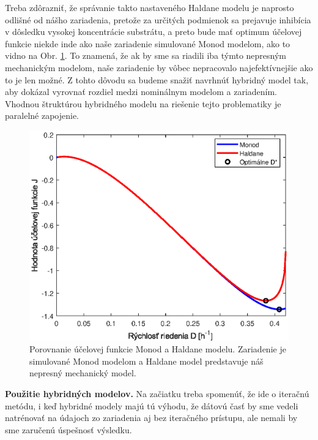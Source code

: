 Treba zdôrazniť, že správanie takto nastaveného Haldane modelu je naprosto odlišné od nášho zariadenia, pretože za určitých podmienok sa prejavuje inhibícia v dôsledku vysokej koncentrácie substrátu, a preto bude mať optimum účelovej funkcie niekde inde ako naše zariadenie simulované Monod modelom, ako to vidno na Obr. \ref{fig:cost_fun_comparison}. To znamená, že ak by sme sa riadili iba týmto nepresným mechanickým modelom, naše zariadenie by vôbec nepracovalo najefektívnejšie ako to je len možné. Z tohto dôvodu sa budeme snažiť navrhnúť hybridný model tak, aby dokázal vyrovnať rozdiel medzi nominálnym modelom a zariadením. Vhodnou štruktúrou hybridného modelu na riešenie tejto problematiky je paralelné zapojenie.

\begin{figure}
	\centering
	\includegraphics[width=0.7\linewidth]{images/cost_fun_comparison}
	\caption{Porovnanie účelovej funkcie Monod a Haldane modelu. Zariadenie je simulované Monod modelom a Haldane model predstavuje náš nepresný mechanický model.}
	\label{fig:cost_fun_comparison}
\end{figure}

\textbf{Použitie hybridných modelov.} Na začiatku treba spomenúť, že ide o iteračnú metódu, i keď hybridné modely majú tú výhodu, že dátovú časť by sme vedeli natrénovať na údajoch zo zariadenia aj bez iteračného prístupu, ale nemali by sme zaručenú úspešnosť výsledku. 

